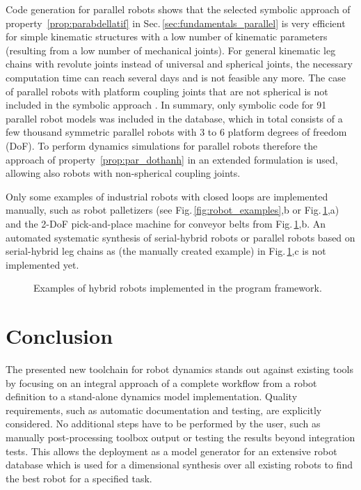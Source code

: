 \documentclass[runningheads]{llncs}
\begin{document}
Code generation for parallel robots shows that the selected symbolic approach \cite{AbdellatifHei2009} of property~\ref{prop:parabdellatif} in Sec.\,\ref{sec:fundamentals_parallel} is very efficient for simple kinematic structures with a low number of kinematic parameters (resulting from a low number of mechanical joints).
For general kinematic leg chains with revolute joints instead of universal and spherical joints, the necessary computation time can reach several days and is not feasible any more.
The case of parallel robots with platform coupling joints that are not spherical is not included in the symbolic approach \cite{AbdellatifHei2009}.
In summary, only symbolic code for 91 parallel robot models was included in the database, which in total consists of a few thousand symmetric parallel robots with 3 to 6 platform degrees of freedom (DoF).
To perform dynamics simulations for parallel robots therefore the approach \cite{DoThanhKotHeiOrt2009b} of property~\ref{prop:par_dothanh} in an extended formulation is used, allowing also robots with non-spherical coupling joints.

Only some examples of industrial robots with closed loops are implemented manually, such as robot palletizers (see Fig.\,\ref{fig:robot_examples},b or Fig.\,\ref{fig:robot_examples_hybrid},a) and the 2-DoF pick-and-place machine for conveyor belts from Fig.\,\ref{fig:robot_examples_hybrid},b.
An automated systematic synthesis of serial-hybrid robots or parallel robots based on serial-hybrid leg chains as (the manually created example) in Fig.\,\ref{fig:robot_examples_hybrid},c is not implemented yet.

\begin{figure}[tb]

\vspace{-0.6cm}
\caption{Examples of hybrid robots implemented in the program framework.} %
\vspace{-0.1cm}
\label{fig:robot_examples_hybrid}
\end{figure} 

\section{Conclusion}
\label{sec:conclusion}

The presented new toolchain for robot dynamics stands out against existing tools by focusing on an integral approach of a complete workflow from a robot definition to a stand-alone dynamics model implementation.
Quality requirements, such as automatic documentation and testing, are explicitly considered.
No additional steps have to be performed by the user, such as manually post-processing toolbox output or testing the results beyond integration tests.
This allows the deployment as a model generator for an extensive robot database which is used for a dimensional synthesis over all existing robots to find the best robot for a specified task.
\end{document}
